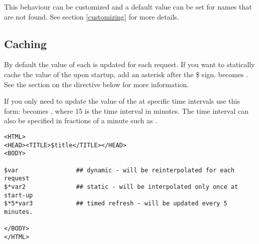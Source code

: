 This behaviour can be customized and a default value can be set for names
that are not found. See section \ref{customizing} for more details.


\subsection{Caching}

By default the value of each  is updated for each request.
If you want to statically cache the value of the  upon
startup, add an asterisk after the \$ sign.   becomes .
See the section on the  directive below for more information.

If you only need to update the value of the  at specific time intervals use
this form:  becomes  , where 15 is the time interval in
minutes.  The time interval can also be specified in fractions of a minute such
as .

\begin{verbatim}
<HTML>
<HEAD><TITLE>$title</TITLE></HEAD>
<BODY>

$var                ## dynamic - will be reinterpolated for each request
$*var2              ## static - will be interpolated only once at start-up
$*5*var3            ## timed refresh - will be updated every 5 minutes.

</BODY>
</HTML>
\end{verbatim}


